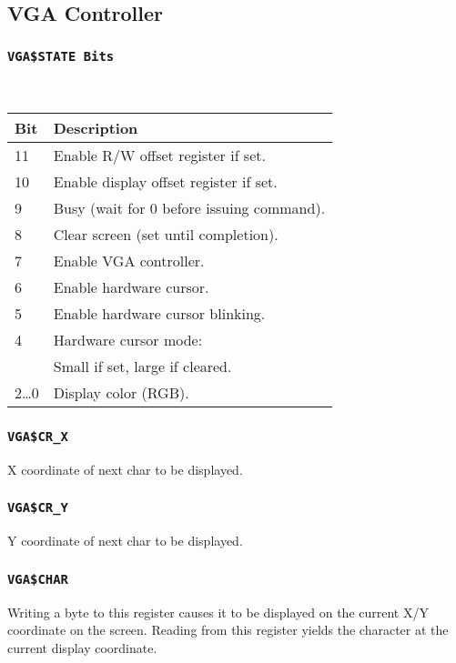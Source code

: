 \documentclass{leaflet}
\begin{document}
  \subsection{VGA Controller}
   \subsubsection{\texttt{VGA\$STATE Bits}}
~
\vspace*{-4mm}
    \begin{center}
{\scriptsize
     \begin{longtable}{|l|l|}
      \hline
      Bit&Description\\
      \hline
      \hline
      11&Enable R/W offset register if set.\\
      10&Enable display offset register if set.\\
      9&Busy (wait for 0 before issuing command).\\
      8&Clear screen (set until completion).\\
      7&Enable VGA controller.\\
      6&Enable hardware cursor.\\
      5&Enable hardware cursor blinking.\\
      4&Hardware cursor mode:\\
       &Small if set, large if cleared.\\
      2\dots 0&Display color (RGB).\\
      \hline
     \end{longtable}
}
    \end{center}
\vspace*{-15mm}
   \subsubsection{\texttt{VGA\$CR\_X}}
    X coordinate of next char to be displayed.
\vspace*{-8mm}
   \subsubsection{\texttt{VGA\$CR\_Y}}
    Y coordinate of next char to be displayed.
\vspace*{-8mm}
   \subsubsection{\texttt{VGA\$CHAR}}
    Writing a byte to this register causes it to be displayed on the current
    X/Y coordinate on the screen. Reading from this register yields the 
    character at the current display coordinate.
\vspace*{-5mm}
\end{document}
